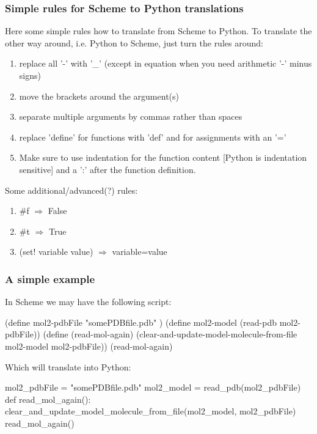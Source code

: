 \documentclass{article}
\begin{document}
\subsubsection{Simple rules for Scheme to Python translations}
Here some simple rules how to translate from Scheme to Python. To translate the other way around, i.e. Python to Scheme, just turn the rules around:
\begin{enumerate}
   \item replace all '-' with '\_' (except in equation when you need arithmetic '-' minus signs)
   \item move the brackets around the argument(s)
   \item separate multiple arguments by commas rather than spaces
   \item replace 'define' for functions with 'def' and for assignments with an '='
   \item Make sure to use indentation for the function content [Python is indentation sensitive] and a ':' after the function definition. 
\end{enumerate}
Some additional/advanced(?) rules:
\begin{enumerate}
   \item \#f $\Rightarrow$ False
   \item \#t $\Rightarrow$ True
   \item (set! variable value) $\Rightarrow$ variable=value 
\end{enumerate}

\subsubsection{A simple example}

In Scheme we may have the following script:

\begin{guile}
(define mol2-pdbFile "somePDBfile.pdb" )
(define mol2-model (read-pdb mol2-pdbFile))
(define (read-mol-again)
        (clear-and-update-model-molecule-from-file mol2-model mol2-pdbFile))
(read-mol-again)
\end{guile}

Which will translate into Python:

\begin{python}
 mol2_pdbFile = "somePDBfile.pdb"
 mol2_model = read_pdb(mol2_pdbFile)
 def read_mol_again():
     clear_and_update_model_molecule_from_file(mol2_model, mol2_pdbFile)
 read_mol_again()
\end{python}
\end{document}
